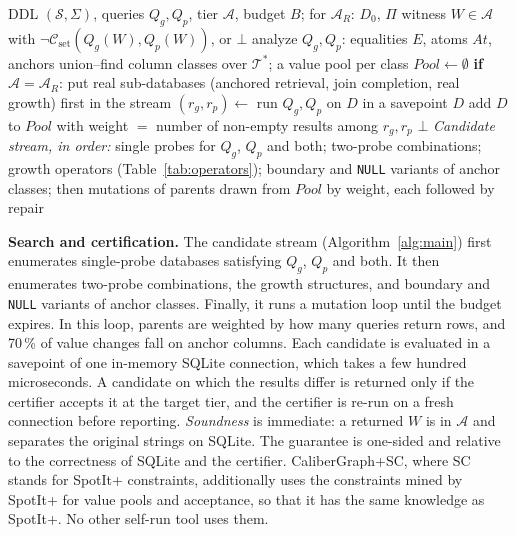\begin{algorithm}[t]
\caption{CaliberGraph. CaliberGraph-R adds line 4.}\label{alg:main}
\footnotesize
\begin{algorithmic}[1]
\Require DDL $(\mathcal S,\Sigma)$, queries $Q_g,Q_p$, tier $\mathcal A$, budget $B$; for $\mathcal A_R$: $D_0$, $\Pi$
\Ensure witness $W\in\mathcal A$ with $\neg\mathcal C_{\mathrm{set}}(Q_g(W),Q_p(W))$, or $\bot$
\State analyze $Q_g,Q_p$: equalities $E$, atoms $\mathit{At}$, anchors
\State union--find column classes over $\mathcal T^{*}$; a value pool per class
\State $\mathit{Pool}\gets\emptyset$
\State \textbf{if} $\mathcal A=\mathcal A_R$: put real sub-databases (anchored retrieval, join completion, real growth) first in the stream
  \State $(r_g,r_p)\gets$ run $Q_g,Q_p$ on $D$ in a savepoint
    \State \Return $D$ 
  \EndIf
  \State add $D$ to $\mathit{Pool}$ with weight $=$ number of non-empty results among $r_g,r_p$
\EndFor
\State \Return $\bot$
\Statex \emph{Candidate stream, in order:} single probes for $Q_g$, $Q_p$ and both; two-probe combinations; growth operators (Table~\ref{tab:operators}); boundary and \texttt{NULL} variants of anchor classes; then mutations of parents drawn from $\mathit{Pool}$ by weight, each followed by repair
\end{algorithmic}
\end{algorithm}

\textbf{Search and certification.} The candidate stream (Algorithm~\ref{alg:main}) first enumerates single-probe databases satisfying $Q_g$, $Q_p$ and both. It then enumerates two-probe combinations, the growth structures, and boundary and \texttt{NULL} variants of anchor classes. Finally, it runs a mutation loop until the budget expires. In this loop, parents are weighted by how many queries return rows, and 70\,\% of value changes fall on anchor columns. Each candidate is evaluated in a savepoint of one in-memory SQLite connection, which takes a few hundred microseconds. A candidate on which the results differ is returned only if the certifier accepts it at the target tier, and the certifier is re-run on a fresh connection before reporting. \emph{Soundness} is immediate: a returned $W$ is in $\mathcal A$ and separates the original strings on SQLite. The guarantee is one-sided and relative to the correctness of SQLite and the certifier. CaliberGraph+SC, where SC stands for SpotIt+ constraints, additionally uses the constraints mined by SpotIt+ for value pools and acceptance, so that it has the same knowledge as SpotIt+. No other self-run tool uses them.

